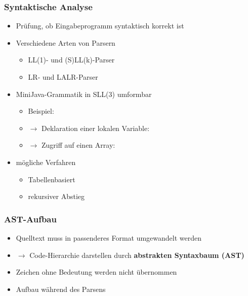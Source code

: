 \begin{frame}
    \frametitle{Syntaktische Analyse}
    \begin{itemize}
    \item Prüfung, ob Eingabeprogramm syntaktisch korrekt ist
    \item Verschiedene Arten von Parsern
    	\begin{itemize}
    	\item LL(1)- und (S)LL(k)-Parser
    	\item LR- und LALR-Parser
    	\end{itemize}
    \item MiniJava-Grammatik in SLL(3) umformbar \pause
    \begin{itemize}
    	\item Beispiel: \code{a[}
    	\item[] $\rightarrow$ Deklaration einer lokalen Variable: 
    	\item[] $\rightarrow$ Zugriff auf einen Array: 
    \end{itemize} \pause
    \item mögliche Verfahren
	    \begin{itemize}
		\item Tabellenbasiert
		\item rekursiver Abstieg
    	\end{itemize}
    \end{itemize}
\end{frame}

\begin{frame}
	\frametitle{AST-Aufbau}
	\begin{itemize}
	\item Quelltext muss in passenderes Format umgewandelt werden
	\item[] $\rightarrow$ Code-Hierarchie darstellen durch \textbf{abstrakten Syntaxbaum (AST)}
	\item Zeichen ohne Bedeutung werden nicht übernommen
	\item Aufbau während des Parsens
	\end{itemize}
\end{frame}

